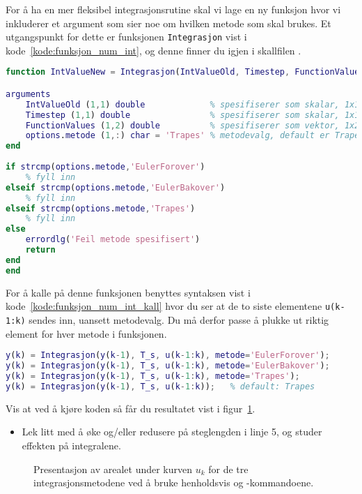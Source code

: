 For å ha en mer fleksibel integrasjonsrutine skal vi lage en ny
funksjon hvor vi inkluderer et argument som sier noe om hvilken
metode som skal brukes.
Et utgangspunkt for dette er funksjonen {\tt Integrasjon} vist i
kode~\ref{kode:funksjon_num_int}, og  
denne finner du igjen i skallfilen .
  

\begin{lstlisting}[caption={Den utvidede funksjonen/filen {\tt Integrasjon.m}.},
language= Matlab, 
label=kode:funksjon_num_int,
 numbers=none]
function IntValueNew = Integrasjon(IntValueOld, Timestep, FunctionValues, options)

arguments
    IntValueOld (1,1) double             % spesifiserer som skalar, 1x1
    Timestep (1,1) double                % spesifiserer som skalar, 1x1
    FunctionValues (1,2) double          % spesifiserer som vektor, 1x2
    options.metode (1,:) char = 'Trapes' % metodevalg, default er Trapes
end
    
if strcmp(options.metode,'EulerForover')
    % fyll inn
elseif strcmp(options.metode,'EulerBakover')
    % fyll inn
elseif strcmp(options.metode,'Trapes')
    % fyll inn
else
    errordlg('Feil metode spesifisert')
    return
end
end
\end{lstlisting}

For å kalle på denne 
funksjonen benyttes syntaksen vist i
kode~\ref{kode:funksjon_num_int_kall} hvor du ser at de to siste elementene
{\tt  u(k-1:k)} sendes inn, uansett  metodevalg. Du må derfor passe å plukke ut riktig
element for hver metode i funksjonen.  

\begin{lstlisting}[caption={Alternativ bruk av funksjonen {\tt Integrasjon}.},
language= Matlab,  label=kode:funksjon_num_int_kall,
linewidth=13.5cm, numbers=none]
y(k) = Integrasjon(y(k-1), T_s, u(k-1:k), metode='EulerForover');
y(k) = Integrasjon(y(k-1), T_s, u(k-1:k), metode='EulerBakover');
y(k) = Integrasjon(y(k-1), T_s, u(k-1:k), metode='Trapes');
y(k) = Integrasjon(y(k-1), T_s, u(k-1:k));   % default: Trapes
\end{lstlisting}

 Vis at ved å kjøre koden så får du resultatet vist i figur~\ref{fig:3d3}. 

\begin{itemize}
  \item Lek litt med å øke og/eller redusere på steglengden  i linje 5, og studer effekten på integralene.   
\end{itemize}



    \begin{figure}[H]
      \centering
      \hspace*{0mm}
      \caption{Presentasjon av arealet under  kurven $u_{k}$ for de
        tre integrasjonsmetodene ved å bruke henholdsvis 
        {\color{red}} og {\color{red}}-kommandoene.}
      \label{fig:3d3}
    \end{figure}

